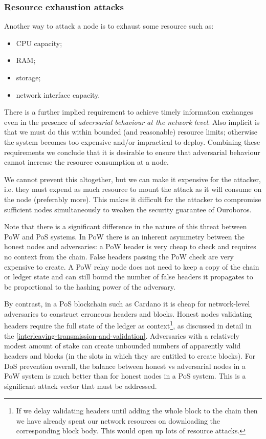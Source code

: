 \documentclass[11pt,a4paper]{article}
\begin{document}
\subsubsection{Resource exhaustion attacks}
\label{resource-exhaustion-attacks}

Another way to attack a node is to exhaust some resource such as:

\begin{itemize}
\item
  CPU capacity;
\item
  RAM;
\item
  storage;
\item
  network interface capacity.
\end{itemize}

There is a further implied requirement to achieve timely information
exchanges even in the presence of \emph{adversarial behaviour at the
network level}. Also implicit is that we must do this within bounded
(and reasonable) resource limits; otherwise the system becomes too
expensive and/or impractical to deploy. Combining these requirements we
conclude that it is desirable to ensure that adversarial behaviour
cannot increase the resource consumption at a node.

We cannot prevent this altogether, but we can make it expensive for the
attacker, i.e. they must expend as much resource to mount the attack as
it will consume on the node (preferably more). This makes it difficult
for the attacker to compromise sufficient nodes simultaneously to weaken
the security guarantee of Ouroboros.

Note that there is a significant difference in the nature of this threat
between PoW and PoS systems. In PoW there is an inherent asymmetry
between the honest nodes and adversaries: a PoW header is very cheap to
check and requires no context from the chain. False headers passing the
PoW check are very expensive to create. A PoW relay node does not need
to keep a copy of the chain or ledger state and can still bound the
number of false headers it propagates to be proportional to the hashing
power of the adversary.

By contrast, in a PoS blockchain such as Cardano it is cheap for
network-level adversaries to construct erroneous headers and blocks.
Honest nodes validating headers require the full state of the ledger as
context\footnote{If we delay validating headers until adding the whole
  block to the chain then we have already spent our network resources on
  downloading the corresponding block body. This would open up lots of
  resource attacks.}, as discussed in detail in the
\cref{interleaving-transmission-and-validation}. Adversaries with a relatively modest amount of stake can create
unbounded numbers of apparently valid headers and blocks (in the slots
in which they are entitled to create blocks). For DoS prevention
overall, the balance between honest vs adversarial nodes in a PoW system
is much better than for honest nodes in a PoS system. This is a
significant attack vector that must be addressed.
\end{document}
